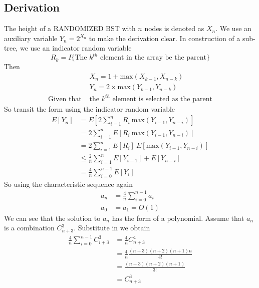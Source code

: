 \documentclass[15pt]{article}
\begin{document}
\subsection{Derivation}
The height of a RANDOMIZED BST with $n$ nodes is denoted as $X_n$. We use an auxiliary variable $Y_n = 2^{X_n}$ to make the derivation clear. In construction of a sub-tree, we use an indicator random variable
\begin{equation}
    R_k = I\{\text{The $k^{th}$ element in the array be the parent}\}
\end{equation}
Then
\begin{equation}
\begin{aligned}
    &X_n = 1 + \text{max} ( X_{k-1}, X_{n-k} )\\
    &Y_n = 2 \times \text{max} (Y_{k-1}, Y_{n-k} )\\ \text{Given that }&\text{the $k^{th}$ element is selected as the parent}
\end{aligned}
\end{equation}
So transit the form using the indicator random variable
\begin{equation}
\begin{aligned}
    E[Y_n] &= E[2\sum_{i=1}^n R_i~\text{max}(Y_{i-1}, Y_{n-i})] \\
    &= 2\sum_{i=1}^n E[R_i~\text{max}(Y_{i-1}, Y_{n-i})]\\
    &= 2\sum_{i=1}^n E[R_i]~E[\text{max}(Y_{i-1},Y_{n-i})]\\
    &\leq \frac{2}{n} \sum_{i=1}^n E[Y_{i-1}] + E[Y_{n-i}]\\
    &= \frac{4}{n}\sum_{i=0}^{n-1} E[Y_i]
\end{aligned}
\end{equation}
So using the characteristic sequence again
\begin{equation}
\begin{aligned}
    a_n &= \frac{4}{n}\sum_{i=0}^{n-1}a_i \\
    a_0 &= a_1 = O(1)
\end{aligned}
\end{equation}
\clearpage
We can see that the solution to $a_n$ has the form of a polynomial. Assume that $a_n$ is a combination $C_{n+3}^3$. Substitute in we obtain
\begin{equation}
\begin{aligned}
    \frac{4}{n}\sum_{i=0}^{n-1} C_{i+3}^{3} &= \frac{4}{n} C_{n+3}^{4} \\
    &= \frac{4}{n} \frac{(n+3)(n+2)(n+1)n}{4!}\\
    &= \frac{(n+3)(n+2)(n+1)}{3!} \\
    &= C_{n+3}^{3}
\end{aligned}
\end{equation}
\end{document}
